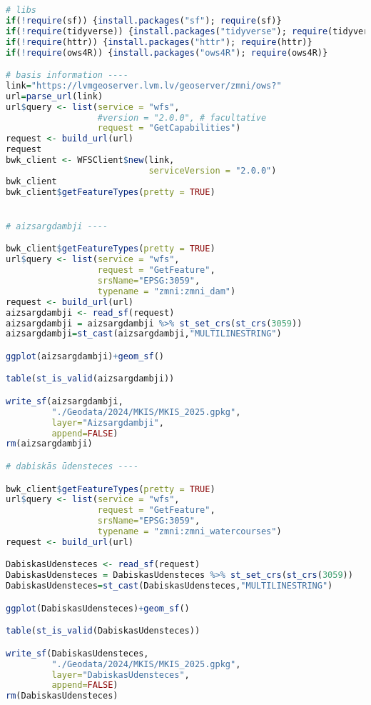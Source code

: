 \documentclass[
]{book}
\begin{document}
\begin{lstlisting}[language=R]
# libs
if(!require(sf)) {install.packages("sf"); require(sf)}
if(!require(tidyverse)) {install.packages("tidyverse"); require(tidyverse)}
if(!require(httr)) {install.packages("httr"); require(httr)}
if(!require(ows4R)) {install.packages("ows4R"); require(ows4R)}

# basis information ----
link="https://lvmgeoserver.lvm.lv/geoserver/zmni/ows?"
url=parse_url(link)
url$query <- list(service = "wfs",
                  #version = "2.0.0", # facultative
                  request = "GetCapabilities")
request <- build_url(url)
request
bwk_client <- WFSClient$new(link, 
                            serviceVersion = "2.0.0")
bwk_client
bwk_client$getFeatureTypes(pretty = TRUE)


# aizsargdambji ----

bwk_client$getFeatureTypes(pretty = TRUE)
url$query <- list(service = "wfs",
                  request = "GetFeature",
                  srsName="EPSG:3059",
                  typename = "zmni:zmni_dam")
request <- build_url(url)
aizsargdambji <- read_sf(request)
aizsargdambji = aizsargdambji %>% st_set_crs(st_crs(3059))
aizsargdambji=st_cast(aizsargdambji,"MULTILINESTRING")

ggplot(aizsargdambji)+geom_sf()

table(st_is_valid(aizsargdambji))

write_sf(aizsargdambji,
         "./Geodata/2024/MKIS/MKIS_2025.gpkg",
         layer="Aizsargdambji",
         append=FALSE)
rm(aizsargdambji)

# dabiskās ūdensteces ----

bwk_client$getFeatureTypes(pretty = TRUE)
url$query <- list(service = "wfs",
                  request = "GetFeature",
                  srsName="EPSG:3059",
                  typename = "zmni:zmni_watercourses")
request <- build_url(url)

DabiskasUdensteces <- read_sf(request)
DabiskasUdensteces = DabiskasUdensteces %>% st_set_crs(st_crs(3059))
DabiskasUdensteces=st_cast(DabiskasUdensteces,"MULTILINESTRING")

ggplot(DabiskasUdensteces)+geom_sf()

table(st_is_valid(DabiskasUdensteces))

write_sf(DabiskasUdensteces,
         "./Geodata/2024/MKIS/MKIS_2025.gpkg",
         layer="DabiskasUdensteces",
         append=FALSE)
rm(DabiskasUdensteces)




\end{lstlisting}
\end{document}
